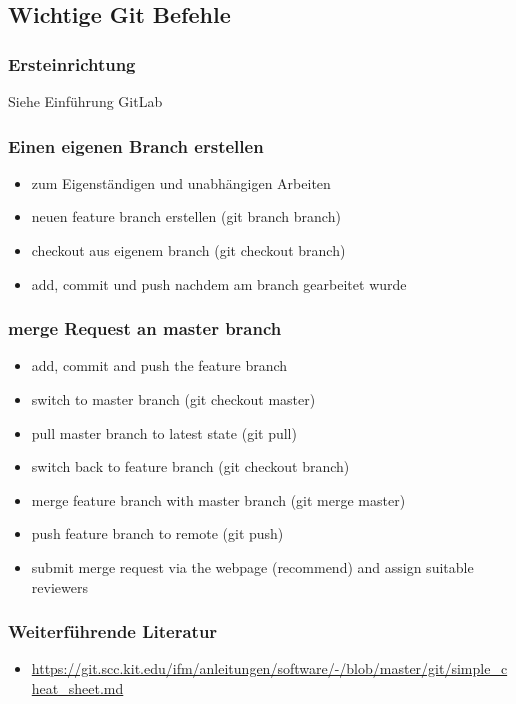\documentclass[12pt,bibstyle=none,pagenumberinfooter]{ifmdocument}
\begin{document}
\subsection{Wichtige Git Befehle}\label{subsec:gitCommands}
\subsubsection{Ersteinrichtung}
 Siehe Einf\"uhrung GitLab
 \subsubsection{Einen eigenen Branch erstellen}
 \begin{itemize}
 	\item zum Eigenst\"andigen und unabh\"angigen Arbeiten 
 	\item neuen feature branch erstellen (git branch branch)
 	\item checkout aus eigenem branch (git checkout branch)
 	\item add, commit und push nachdem am branch gearbeitet wurde
 \end{itemize}
 
 \subsubsection{merge Request an master branch}
 \begin{itemize}
 	\item add, commit and push the feature branch
 	\item switch to master branch (git checkout master)
 	\item pull master branch to latest state (git pull)
 	\item switch back to feature branch (git checkout branch)
 	\item merge feature branch with master branch (git merge master)
 	\item push feature branch to remote (git push)
 	\item submit merge request via the webpage (recommend) and assign suitable reviewers
 \end{itemize}
 
\subsubsection{Weiterführende Literatur}
\begin{itemize}
\item \url{https://git.scc.kit.edu/ifm/anleitungen/software/-/blob/master/git/simple_cheat_sheet.md}
\end{itemize}
\end{document}
